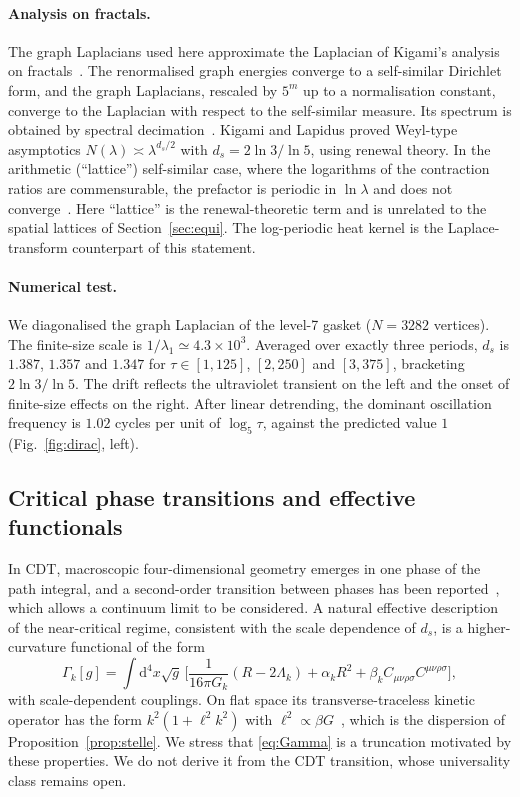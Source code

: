\documentclass[11pt]{article}
\theoremstyle{remark}\newtheorem*{remark}{Remark}
\newcommand{\dd}{\mathrm{d}}
\begin{document}
\paragraph{Analysis on fractals.} The graph Laplacians used here approximate the Laplacian of Kigami's analysis
on fractals~\cite{Kigami,Strichartz}. The renormalised graph energies converge to a self-similar Dirichlet form,
and the graph Laplacians, rescaled by $5^m$ up to a normalisation constant, converge to the Laplacian with respect
to the self-similar measure. Its spectrum is obtained by spectral decimation~\cite{FukushimaShima}. Kigami and
Lapidus proved Weyl-type asymptotics $N(\lambda)\asymp\lambda^{d_s/2}$ with $d_s=2\ln3/\ln5$, using renewal theory. In the
arithmetic (``lattice'') self-similar case, where the logarithms of the contraction ratios are commensurable,
the prefactor is periodic in $\ln\lambda$ and does not converge~\cite{KigamiLapidus}. Here ``lattice'' is the
renewal-theoretic term and is unrelated to the spatial lattices of Section~\ref{sec:equi}. The log-periodic heat
kernel is the Laplace-transform counterpart of this statement.

\paragraph{Numerical test.} We diagonalised the graph Laplacian of the level-7 gasket ($N=3282$ vertices). The
finite-size scale is $1/\lambda_1\simeq4.3\times10^3$. Averaged over exactly three periods, $d_s$ is $1.387$, $1.357$
and $1.347$ for $\tau\in[1,125]$, $[2,250]$ and $[3,375]$, bracketing $2\ln3/\ln5$. The drift reflects the
ultraviolet transient on the left and the onset of finite-size effects on the right. After linear detrending,
the dominant oscillation frequency is $1.02$ cycles per unit of $\log_5\tau$, against the predicted value $1$
(Fig.~\ref{fig:dirac}, left).

\subsection{Critical phase transitions and effective functionals}
In CDT, macroscopic four-dimensional geometry emerges in one phase of the path integral, and a second-order
transition between phases has been reported~\cite{AJJL}, which allows a continuum limit to be considered. A
natural effective description of the near-critical regime, consistent with the scale dependence of $d_s$, is a
higher-curvature functional of the form
\begin{equation}
\Gamma_k[g]=\int\dd^4x\sqrt g\,\Big[\frac{1}{16\pi G_k}(R-2\Lambda_k)+\alpha_k R^2+\beta_k C_{\mu\nu\rho\sigma}C^{\mu\nu\rho\sigma}\Big],
\label{eq:Gamma}
\end{equation}
with scale-dependent couplings. On flat space its transverse-traceless kinetic operator has the form
$k^2(1+\ell^2k^2)$ with $\ell^2\propto\beta G$~\cite{Stelle}, which is the dispersion of Proposition~\ref{prop:stelle}. We stress that
\eqref{eq:Gamma} is a truncation motivated by these properties. We do not derive it from the CDT transition,
whose universality class remains open.
\end{document}
